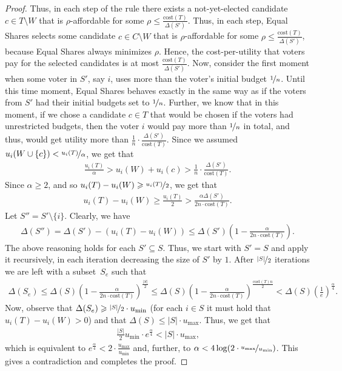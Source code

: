 \documentclass[10pt]{scrartcl}
\renewcommand*{\le}{\leqslant}
\renewcommand*{\leq}{\leqslant}
\renewcommand*{\geq}{\geqslant}
\newcommand{\cost}{{{\mathrm{cost}}}}
\theoremstyle{definition}
\theoremstyle{plain}
\begin{document}
\begin{proof}
Thus, in each step of the rule there exists a not-yet-elected candidate $c \in T \setminus W$ that is $\rho$-affordable for some $\rho \le \frac{\cost(T)}{\Delta(S')}$. Thus, in each step, Equal Shares selects some candidate $c \in C \setminus W$ that is $\rho$-affordable for some $\rho \le \frac{\cost(T)}{\Delta(S')}$, because Equal Shares always minimizes $\rho$.
Hence, the cost-per-utility that voters pay for the selected candidates is at most $\frac{\cost(T)}{\Delta(S')}$.
Now, consider the first moment when some voter in $S'$, say $i$, uses more than the voter's initial budget $\nicefrac{1}{n}$. Until this time moment, Equal Shares behaves exactly in the same way as if the voters from $S'$ had their initial budgets set to $\nicefrac{1}{n}$. Further, we know that in this moment, if we chose a candidate $c \in T$ that would be chosen if the voters had unrestricted budgets, then the voter $i$ would pay more than $\nicefrac{1}{n}$ in total, and thus, would get utility more than $\frac{1}{n} \cdot \frac{\Delta(S')}{\cost(T)}$. Since we assumed $u_i(W \cup \{c\}) < \nicefrac{u_i(T)}{\alpha}$, we get that
\begin{align*}
	\frac{u_i(T)}{\alpha} > u_i(W) + u_i(c) > \frac{1}{n} \cdot \frac{\Delta(S')}{\cost(T)} \text{.}
\end{align*}
Since $\alpha \geq 2$, and so $u_i(T) - u_i(W) \geq \nicefrac{u_i(T)}{2}$, we get that
\begin{align*}
	u_i(T) - u_i(W) \geq \frac{u_i(T)}{2} > \frac{\alpha \Delta(S')}{2n \cdot \cost(T)} \text{.}
\end{align*}
Let $S'' = S' \setminus \{i\}$. Clearly, we have
\begin{align*} 
	\Delta(S'') = \Delta(S') - (u_i(T)  - u_i(W)) \leq \Delta(S')\left(1 - \frac{\alpha}{2n \cdot \cost(T)}\right) \text{.}
\end{align*}
The above reasoning holds for each $S' \subseteq S$. Thus, we start with $S' = S$ and apply it recursively, in each iteration decreasing the size of $S'$ by $1$. After $\nicefrac{|S|}{2}$ iterations we are left with a subset~$S_{e}$ such that
\begin{align*} 
	\Delta(S_e) \leq \Delta(S)\left(1 - \frac{\alpha}{ 2n \cdot \cost(T)}\right)^{\frac{|S|}{2}} \leq \Delta(S)\left(1 - \frac{\alpha}{2 n \cdot \cost(T)}\right)^{\frac{\cost(T)n}{2}} < \Delta(S)\left(\frac{1}{e}\right)^{\frac{\alpha}{4}} \text{.}
\end{align*}  
Now, observe that $\Delta(S_e) \geq \nicefrac{|S|}{2} \cdot u_{\min}$ (for each $i \in S$ it must hold that $u_i(T) - u_i(W) > 0$) and that $ \Delta(S) \leq |S|\cdot u_{\max}$. Thus, we get that
\begin{align*}
	\frac{|S|}{2} u_{\min} \cdot e^{\frac{\alpha}{4}} < |S|\cdot u_{\max} \text{,}
\end{align*}
which is equivalent to $e^{\frac{\alpha}{4}} < 2\cdot \frac{u_{\max}}{u_{\min}}$ and, further, to $\alpha < 4\log(2\cdot \nicefrac{u_{\max}}{u_{\min}})$. This gives a contradiction and completes the proof.
\end{proof}
\end{document}
